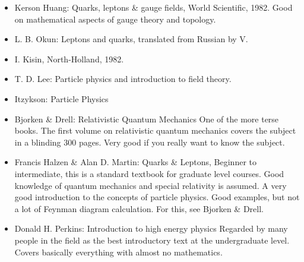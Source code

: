 \documentclass[10pt,a4paper]{book}
\theoremstyle{definition}
\begin{document}
\begin{itemize}
\item 
Kerson Huang: Quarks, leptons \& gauge fields, World Scientific, 1982.
Good on mathematical aspects of gauge theory and topology.
\item L. B. Okun: Leptons and quarks, translated from Russian by V. \item I. Kisin, North-Holland, 1982.
\item T. D. Lee: Particle physics and introduction to field theory.
\item Itzykson: Particle Physics
\item Bjorken \& Drell: Relativistic Quantum Mechanics
One of the more terse books.  The first volume on relativistic quantum mechanics covers the subject in a blinding 300 pages.  Very good if you really want to know the subject.
\item Francis Halzen \& Alan D. Martin: Quarks \& Leptons,
Beginner to intermediate, this is a standard textbook for graduate level courses.  Good knowledge of quantum mechanics and special relativity is assumed.  A very good introduction to the concepts of particle physics.  Good examples, but not a lot of Feynman diagram calculation.  For this, see Bjorken \& Drell.

\item Donald H. Perkins: Introduction to high energy physics
Regarded by many people in the field as the best introductory text at the undergraduate level.  Covers basically everything with almost no mathematics.


\end{itemize}
\end{document}
